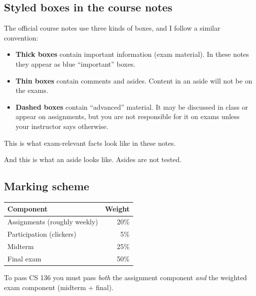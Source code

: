 \subsection{Styled boxes in the course notes}

The official course notes use three kinds of boxes, and I follow a similar convention:
\begin{itemize}
  \item \textbf{Thick boxes} contain important information (exam material). In these notes
    they appear as blue ``important'' boxes.
  \item \textbf{Thin boxes} contain comments and asides. Content in an aside will not be
    on the exams.
  \item \textbf{Dashed boxes} contain ``advanced'' material. It may be discussed in class
    or appear on assignments, but you are not responsible for it on exams unless your
    instructor says otherwise.
\end{itemize}

\begin{important}
This is what exam-relevant facts look like in these notes.
\end{important}

\begin{aside}
And this is what an aside looks like. Asides are not tested.
\end{aside}

\subsection{Marking scheme}

\begin{center}
\begin{tabular}{lr}
  \toprule
  Component & Weight \\
  \midrule
  Assignments (roughly weekly) & 20\% \\
  Participation (clickers) & 5\% \\
  Midterm & 25\% \\
  Final exam & 50\% \\
  \bottomrule
\end{tabular}
\end{center}

\begin{important}
To pass CS 136 you must pass \emph{both} the assignment component \emph{and} the weighted
exam component (midterm + final).
\end{important}

